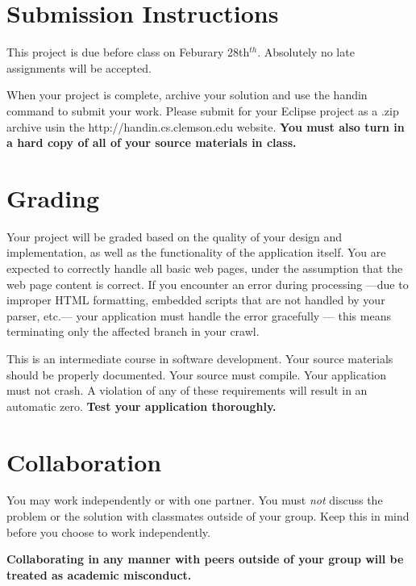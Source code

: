 \documentclass[11pt]{article}
\begin{document}
\section{Submission Instructions}
This project is due before class on Feburary 28th$^{th}$. Absolutely no late assignments
will be accepted.

When your project is complete, archive your solution and use the handin command to submit your
work.  Please submit for your Eclipse project as a .zip archive usin the http://handin.cs.clemson.edu website.
{\bf You must also turn in a hard copy of all of your source materials in class.}

\section{Grading}
Your project will be graded based on the quality of your design and
implementation, as well as the functionality of the application itself. You are
expected to correctly handle all basic web pages, under the assumption that the
web page content is correct. If you encounter an error during processing
---due to improper HTML formatting, embedded scripts that are not handled by
your parser, etc.--- your application must handle the error gracefully --- this
means terminating only the affected branch in your crawl.

This is an intermediate course in software development. Your source materials
should be properly documented. Your source must compile. Your application must
not crash. A violation of any of these requirements will result in an automatic
zero. {\bf Test your application thoroughly.}

\section{Collaboration}
You may work independently or with one partner. You must {\em not} discuss the
problem or the solution with classmates outside of your group. Keep this in
mind before you choose to work independently. 

{\bf Collaborating in any manner with peers outside of your group will be treated as
academic misconduct.}
\end{document}
